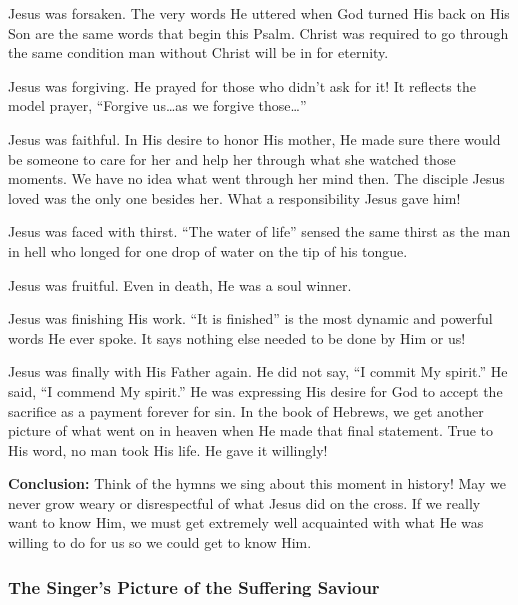 \begin{compactenum}[I.][8]
    \item Jesus was forsaken.
 The very words He uttered when God turned His back on His Son are the same words that begin this Psalm.  Christ was required to go through the same condition man without Christ will be in for eternity.
    \item Jesus was forgiving.
 He prayed for those who didn’t ask for it!  It reflects the model prayer, “Forgive us…as we forgive those…”
    \item Jesus was faithful.
 In His desire to honor His mother, He made sure there would be someone to care for her and help her through what she watched those moments.  We have no idea what went through her mind then.  The disciple Jesus loved was the only one besides her.  What a responsibility Jesus gave him!
    \item  Jesus was faced with thirst.
 “The water of life” sensed the same thirst as the man in hell who longed for one drop of water on the tip of his tongue.
    \item Jesus was fruitful.  Even in death, He was a soul winner.
    \item Jesus was finishing His work.
 “It is finished” is the most dynamic and powerful words He ever spoke.  It says nothing else needed to be done by Him or us!
    \item Jesus was finally with His Father again.
 He did not say, “I commit My spirit.”  He said, “I commend My spirit.”  He was expressing His desire for God to accept the sacrifice as a payment forever for sin.  In the book of Hebrews, we get another picture of what went on in heaven when He made that final statement.  True to His word, no man took His life.  He gave it willingly!\\
\end{compactenum}

\noindent \textbf{Conclusion:}  Think of the hymns we sing about this moment in history!  May we never grow weary or disrespectful of what Jesus did on the cross.  If we really want to know Him, we must get extremely well acquainted with what He was willing to do for us so we could get to know Him.



\subsubsection{The Singer’s Picture of the Suffering Saviour}

